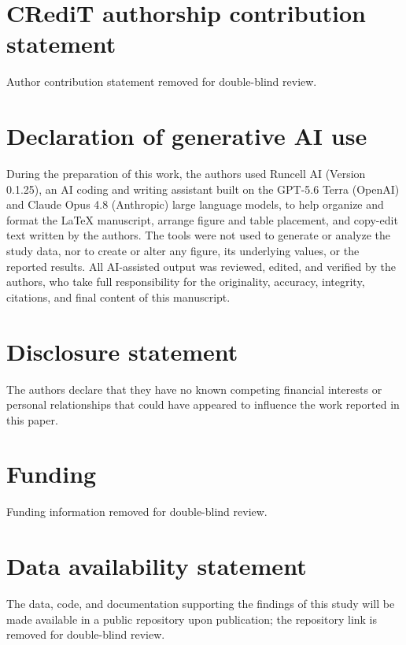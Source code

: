 \documentclass[]{interact}
\begin{document}
\section*{CRediT authorship contribution statement}
Author contribution statement removed for double-blind review. 

\section*{Declaration of generative AI use}
During the preparation of this work, the authors used Runcell AI (Version 0.1.25), an AI coding and writing assistant built on the GPT-5.6 Terra (OpenAI) and Claude Opus 4.8 (Anthropic) large language models, to help organize and format the \LaTeX{} manuscript, arrange figure and table placement, and copy-edit text written by the authors. The tools were not used to generate or analyze the study data, nor to create or alter any figure, its underlying values, or the reported results. All AI-assisted output was reviewed, edited, and verified by the authors, who take full responsibility for the originality, accuracy, integrity, citations, and final content of this manuscript. 

\section*{Disclosure statement}
The authors declare that they have no known competing financial interests or personal relationships that could have appeared to influence the work reported in this paper.

\section*{Funding}
Funding information removed for double-blind review.

\section*{Data availability statement}
The data, code, and documentation supporting the findings of this study will be made available in a public repository upon publication; the repository link is removed for double-blind review. 


\end{document}
